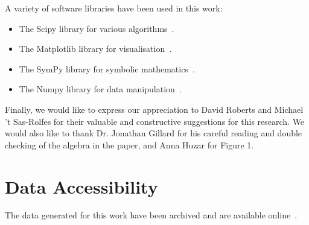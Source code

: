 \documentclass[10pt]{article}
\begin{document}
A variety of software libraries have been used in this work:

\begin{itemize}
    \item The Scipy library for various algorithms~\cite{scipy}.
    \item The Matplotlib library for visualisation~\cite{hunter2007matplotlib}.
    \item The SymPy library for symbolic mathematics~\cite{sympy}.
    \item The Numpy library for data manipulation~\cite{walt2011numpy}.
\end{itemize}

Finally, we would like to express our appreciation to David Roberts and Michael 't
Sas-Rolfes for their valuable and constructive suggestions for this research.
We would also like to thank
Dr. Jonathan Gillard for his careful reading and double checking of the algebra in the paper, and Anna Huzar for Figure 1.

\section*{Data Accessibility}

The data generated for this work have been archived and are available
online~\cite{Glynatsi2017}.



\end{document}
